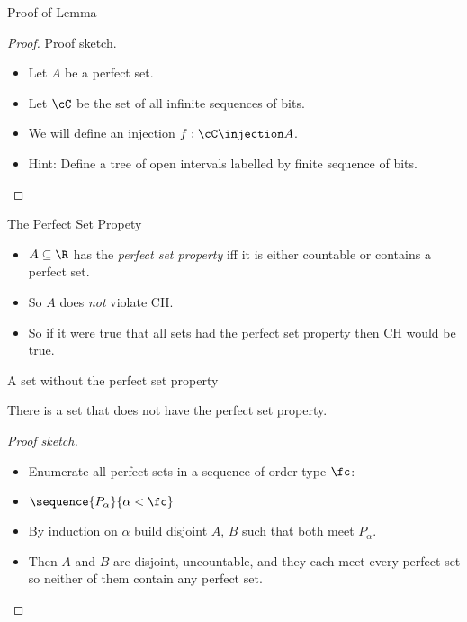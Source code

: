 \documentclass{beamer}
\begin{document}
\begin{frame}{Proof of Lemma}

\begin{proof}{Proof sketch.}
\begin{itemize}
  \item  Let $A$ be a perfect set.

  \item  Let $\cC$ be the set of all infinite sequences of bits.

  \item  We will define an injection $f : \cC \injection A$.


  \item Hint: Define a tree of open intervals labelled by finite sequence of
  bits.

\end{itemize}
\end{proof}
\end{frame}

\begin{frame}{The Perfect Set Propety}

\begin{definition}
\begin{itemize}
  \item $A\subseteq\R$ has the \emph{perfect set property} iff it is either
  countable or contains a perfect set.
  \item So $A$ does \emph{not} violate CH.
  \item So if it were true that all sets had the perfect set property then CH
        would be true.
\end{itemize}
\end{definition}

\end{frame}

\begin{frame}{A set without the perfect set property}

\begin{lemma}
There is a set that does not have the perfect set property.
\end{lemma}

\begin{proof}[Proof sketch]
\begin{itemize}
  \item Enumerate all perfect sets in a sequence of order type $\fc$:
  \item $\sequence{P_{\alpha}}{\alpha < \fc}$
  \item By induction on $\alpha$ build disjoint $A$, $B$ such that both meet $P_{\alpha}$.
  \item Then $A$ and $B$ are disjoint, uncountable, and they each meet every
        perfect set so neither of them contain any perfect set.
\end{itemize}
\end{proof}
\end{frame}
\end{document}

